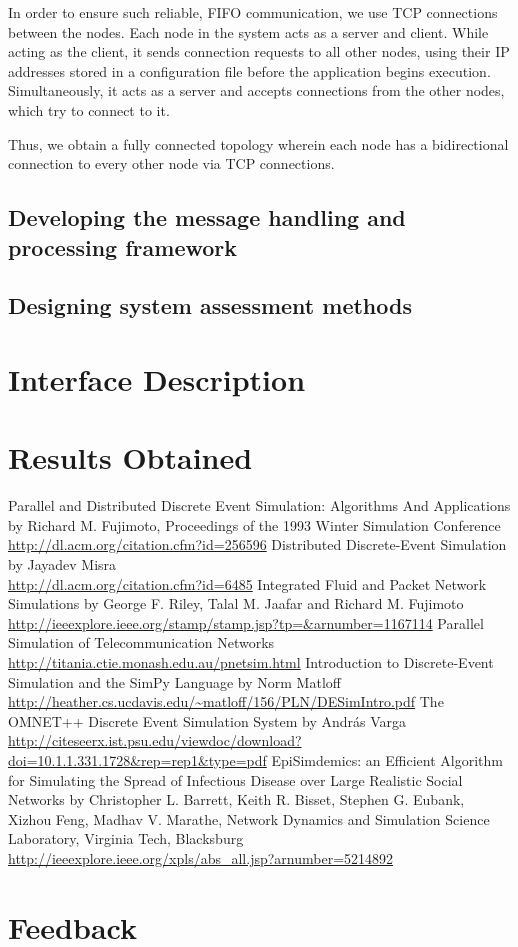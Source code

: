\documentclass[12pt,a4paper]{article}
\begin{document}
In order to ensure such reliable, FIFO communication, we use TCP connections between the nodes. Each node in the system acts as a server and client. While acting as the client, it sends connection requests to all other nodes, using their IP addresses stored in a configuration file before the application begins execution. Simultaneously, it acts as a server and accepts connections from the other nodes, which try to connect to it.

Thus, we obtain a fully connected topology wherein each node has a bidirectional connection to every other node via TCP connections.
	\subsection{Developing the message handling and processing framework}

	\subsection{Designing system assessment methods}
\section{Interface Description}
	 
\section{Results Obtained}

\begin{thebibliography}{99}
Parallel and Distributed Discrete Event Simulation: Algorithms And Applications by Richard M. Fujimoto, Proceedings of the 1993 Winter Simulation Conference
\\ \url{http://dl.acm.org/citation.cfm?id=256596}
Distributed Discrete-Event Simulation by Jayadev Misra
\\ \url{http://dl.acm.org/citation.cfm?id=6485}
Integrated Fluid and Packet Network Simulations by George F. Riley, Talal M. Jaafar and Richard M. Fujimoto
\\ \url{http://ieeexplore.ieee.org/stamp/stamp.jsp?tp=&arnumber=1167114}
Parallel Simulation of Telecommunication Networks \url{http://titania.ctie.monash.edu.au/pnetsim.html}
Introduction to Discrete-Event Simulation and the SimPy Language by Norm Matloff
\\ \url{http://heather.cs.ucdavis.edu/~matloff/156/PLN/DESimIntro.pdf}
The OMNET++ Discrete Event Simulation System by András Varga
\\ \url{http://citeseerx.ist.psu.edu/viewdoc/download?doi=10.1.1.331.1728&rep=rep1&type=pdf}
EpiSimdemics: an Efficient Algorithm for Simulating the Spread of Infectious Disease over Large Realistic Social Networks by Christopher L. Barrett, Keith R. Bisset, Stephen G. Eubank, Xizhou Feng, Madhav V. Marathe, Network Dynamics and Simulation Science Laboratory, Virginia Tech, Blacksburg
\\ \url{http://ieeexplore.ieee.org/xpls/abs_all.jsp?arnumber=5214892}
\end{thebibliography}

\section{Feedback}
\end{document}
